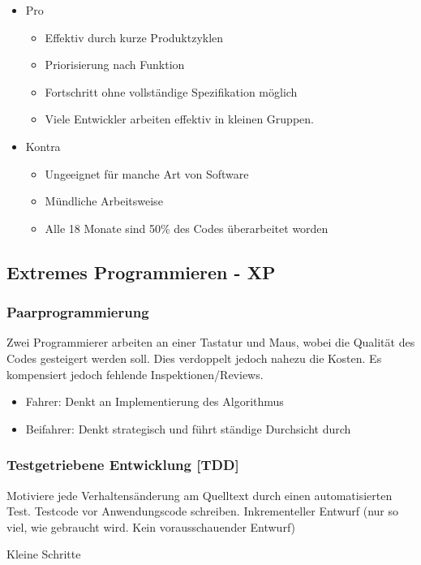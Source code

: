 \begin{itemize}
    \item Pro
    \begin{itemize}
        \item Effektiv durch kurze Produktzyklen
        \item Priorisierung nach Funktion
        \item Fortschritt ohne vollständige Spezifikation möglich
        \item Viele Entwickler arbeiten effektiv in kleinen Gruppen.
    \end{itemize}
    \item Kontra
    \begin{itemize}
        \item Ungeeignet für manche Art von Software
        \item Mündliche Arbeitsweise 
        \item Alle 18 Monate sind 50\% des Codes überarbeitet worden
    \end{itemize}
\end{itemize}


\subsection{Extremes Programmieren - XP}
\subsubsection{Paarprogrammierung}
Zwei Programmierer arbeiten an einer Tastatur und Maus, wobei die Qualität des Codes gesteigert werden soll. Dies verdoppelt jedoch nahezu die Kosten. Es kompensiert jedoch fehlende Inspektionen/Reviews.
\begin{itemize}
    \item Fahrer: Denkt an Implementierung des Algorithmus
    \item Beifahrer: Denkt strategisch und führt ständige Durchsicht durch
\end{itemize}

\subsubsection{Testgetriebene Entwicklung [TDD]}
Motiviere jede Verhaltensänderung am Quelltext durch einen automatisierten Test.
Testcode vor Anwendungscode schreiben.
Inkrementeller Entwurf (nur so viel, wie gebraucht wird. Kein vorausschauender Entwurf)

Kleine Schritte

